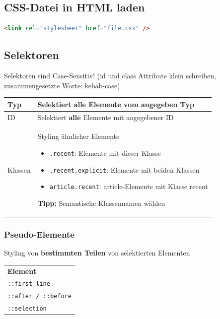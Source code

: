 \documentclass[a4paper, landscape, 8pt]{scrartcl}
\begin{document}
\begin{multicols*}{4}
        \subsection{CSS-Datei in HTML laden}
        \begin{lstlisting}[language=HTMl]
                    <link rel="stylesheet" href="file.css" />
        \end{lstlisting}
        
        \subsection{Selektoren}
        Selektoren sind Case-Sensitiv! (id und class Attribute klein schreiben, zusammengesetzte Worte: kebab-case) \\
        \begin{tabularx}{\columnwidth}{l X}
            Typ & Selektiert \textbf{alle} Elemente vom angegeben Typ \\
            \hline
            ID & Selektiert \textbf{alle} Elemente mit angegebener ID \\
            \hline
            Klassen & Styling ähnlicher Elemente
            \begin{itemize}
                \item \texttt{.recent}: Elemente mit dieser Klasse
                \item \texttt{.recent.explicit}: Elemente mit beiden Klassen
                \item \texttt{article.recent}: article-Elemente mit Klasse recent
            \end{itemize}
            \textbf{Tipp:} Semantische Klassennamen wählen
        \end{tabularx}

        \subsubsection{Pseudo-Elemente}
        Styling von \textbf{bestimmten Teilen} von selektierten Elementen
        \begin{tabularx}{\columnwidth}{X}
            \textbf{Element} \\
            \texttt{::first-line} \\
            \texttt{::after / ::before}\\
            \texttt{::selection}
        \end{tabularx}
        

\end{multicols*}
\end{document}
